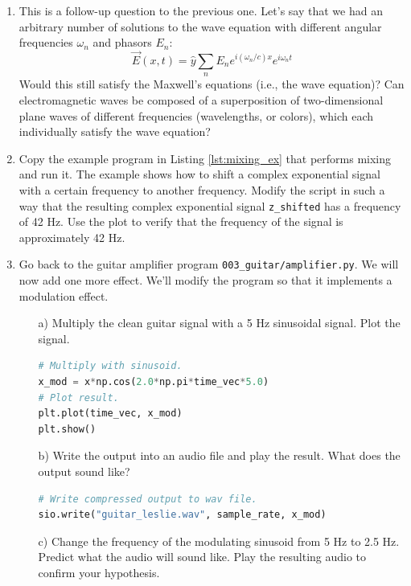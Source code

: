\begin{enumerate}
  \item This is a follow-up question to the previous one. Let's say that we had an arbitrary number 
  of solutions to the wave equation with different angular frequencies $\omega_n$ and phasors $E_n$:
        \begin{equation}
          \vec{E}(x,t) = \hat{y}\sum_n E_n e^{i (\omega_n/c) x} e^{i \omega_n t}
        \end{equation}
        Would this still satisfy the Maxwell's equations (i.e., the wave equation)? 
        Can electromagnetic waves be composed of a superposition of two-dimensional 
        plane waves of different frequencies (wavelengths, or colors), which each 
        individually satisfy the wave equation?

  \item Copy the example program in Listing \ref{lst:mixing_ex} that performs mixing and run it. 
        The example shows how to shift a complex exponential signal with a certain frequency to another frequency.
        Modify the script in such a way that the resulting complex exponential 
        signal \verb|z_shifted| has a frequency of 42 Hz. Use the plot to verify that the 
        frequency of the signal is approximately 42 Hz.

  \item Go back to the guitar amplifier program
        \texttt{003\_guitar/amplifier.py}. We will now add one more
        effect. We'll modify the program so that it implements a modulation effect.

        \begin{itemize}
          \item[a)] Multiply the clean guitar signal with a 5 Hz sinusoidal signal. Plot the signal.
\begin{lstlisting}[language=Python]
# Multiply with sinusoid.
x_mod = x*np.cos(2.0*np.pi*time_vec*5.0)
# Plot result.
plt.plot(time_vec, x_mod)
plt.show()
\end{lstlisting}
          \item[b)] Write the output into an audio file and play the
                result. What does the output sound like?
\begin{lstlisting}[language=Python]
# Write compressed output to wav file. 
sio.write("guitar_leslie.wav", sample_rate, x_mod)
\end{lstlisting}

          \item[c)] Change the frequency of the modulating sinusoid from 5 Hz to 2.5 Hz. 
          Predict what the audio will sound like. Play the resulting audio to confirm your hypothesis.


\end{itemize}
\end{enumerate}
